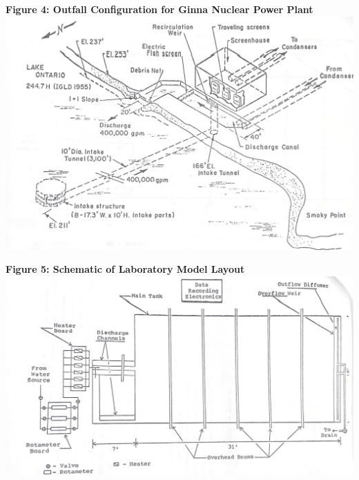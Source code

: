 \documentclass{article}
\begin{document}
\newpage
\begin{center}
{\bf {\large Figure 4: Outfall Configuration for Ginna Nuclear Power Plant\\}}
\vspace{3mm}
\includegraphics*[scale=0.7]{fig4.jpg}
\vspace{5mm}

{\bf {\large Figure 5: Schematic of Laboratory Model Layout\\}}
\vspace{3mm}
\includegraphics*[scale=0.7]{fig5.jpg}
\vspace{5mm}


\end{center}
\end{document}
